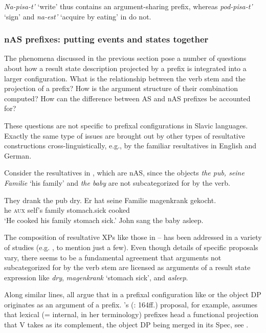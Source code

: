 \documentclass[output=paper,colorlinks,citecolor=brown]{langscibook}
\begin{document}
\noindent \textit{Na-pisa-t'} ‘write’ thus contains an argument-sharing prefix, whereas \textit{pod-pisa-t’} ‘sign’ and \textit{na-est’} ‘acquire by eating’ in  do not.

\subsubsection{nAS prefixes: putting events and states together}\label{sec:3.3.2}
\hypertarget{RefHeadingToc164647629}{}
The phenomena discussed in the previous section pose a number of questions about how a result state description projected by a prefix is integrated into a larger configuration. What is the relationship between the verb stem and the projection of a prefix? How is the argument structure of their combination computed? How can the difference between AS and nAS prefixes be accounted for?

These questions are not specific to prefixal configurations in Slavic languages. Exactly the same type of issues are brought out by other types of resultative constructions cross-linguistically, e.g., by the familiar resultatives in English and German. 

Consider the resultatives in , which are nAS, since the objects \textit{the pub, seine Familie} ‘his family’ and \textit{the baby} are not subcategorized for by the verb.

\ea\label{ex:tatevosov:80}
\ea They drank the pub dry. \hfill \citep{Rappaport.Hovav.Levin2001}\label{ex:tatevosov:80a}
\ex   
\gll Er hat seine Familie magenkrank gekocht.\\
he \textsc{aux} self's family stomach.sick cooked\\\hfill \citep{Kratzer2005}\label{ex:tatevosov:80b}
\glt   ‘He cooked his family stomach sick.’
\ex   John sang the baby asleep. \hfill \citep{Rothstein2004}\label{ex:tatevosov:80c}
\z
\z

\noindent The composition of resultative XPs like those in -- has been addressed in a variety of studies (e.g.  \citealt{Rappaport.Hovav.Levin2001,Rothstein2004,Kratzer2005}, to mention just a few). Even though details of specific proposals vary, there seems to be a fundamental agreement that arguments not subcategorized for by the verb stem are licensed as arguments of a result state expression like \textit{dry}, \textit{magenkrank} ‘stomach sick’, and \textit{asleep}.

Along similar lines, \citet{BabkoMalaya1999,Romanova2007,Gehrke2008,Tatevosov2015a,Biskup2019} all argue that in a prefixal configuration like  or  the object DP originates as an argument of a prefix. \citeauthor{Gehrke2008}'s (\citeyear{Gehrke2008}: 164ff.) proposal, for example, assumes that lexical (= internal, in her terminology) prefixes head a functional projection that V takes as its complement, the object DP being merged in its Spec, see .
\end{document}
